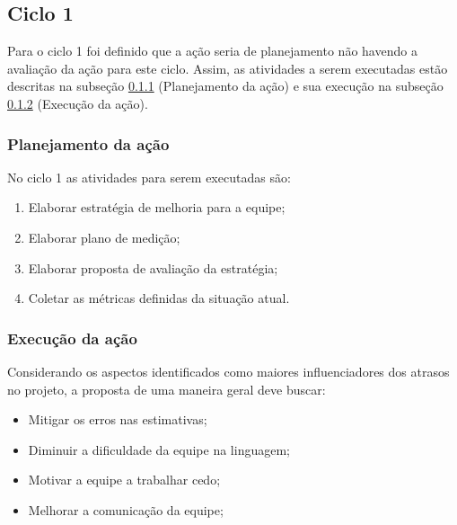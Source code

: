 \subsection{Ciclo 1}

	Para o ciclo 1 foi definido que a ação seria de planejamento não havendo a avaliação da ação para este ciclo. Assim, as atividades a serem
	executadas estão descritas na subseção \ref{sub:planejamento} (Planejamento da ação) e sua execução na subseção \ref{sub:execucao} (Execução da ação).

	\subsubsection{Planejamento da ação}
		\label{sub:planejamento}

		No ciclo 1 as atividades para serem executadas são:

		\begin{enumerate}

			\item Elaborar estratégia de melhoria para a equipe;

			\item Elaborar plano de medição;

			\item Elaborar proposta de avaliação da estratégia;

			\item Coletar as métricas definidas da situação atual.

		\end{enumerate}


	\subsubsection{Execução da ação}
		\label{sub:execucao}


			Considerando os aspectos identificados como maiores influenciadores dos atrasos no projeto, a proposta de uma maneira geral deve buscar:

			\begin{itemize}

				\item Mitigar os erros nas estimativas;
				\item Diminuir a dificuldade da equipe na linguagem;
				\item Motivar a equipe a trabalhar cedo;
				\item Melhorar a comunicação da equipe;
			
			\end{itemize}

